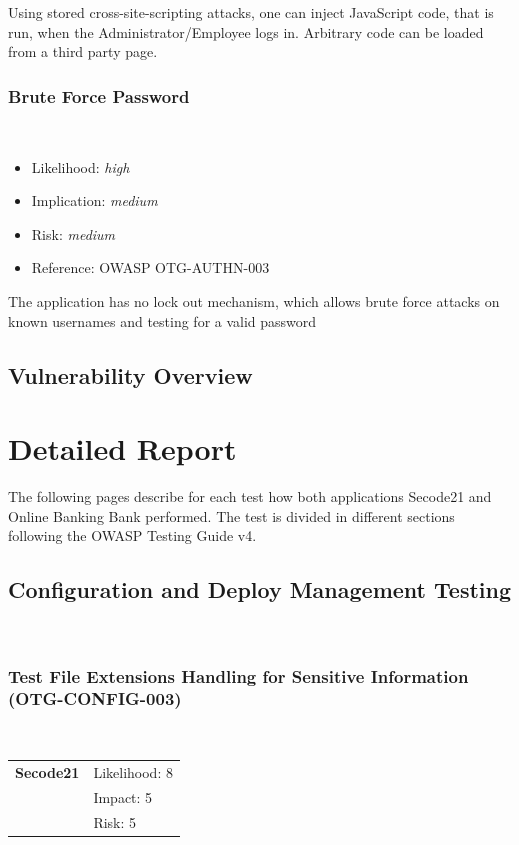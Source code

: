 \documentclass[headsepline,footsepline,footinclude=false,oneside,fontsize=11pt,paper=a4,listof=totoc,bibliography=totoc]{scrbook} %
\begin{document}
Using stored cross-site-scripting attacks, one can inject JavaScript code, that is run, when the Administrator/Employee logs in. Arbitrary code can be loaded from a third party page.

\subsection{{Brute Force Password}}\label{Missing Lock Out Mechanism}\
\begin{itemize}
	\item Likelihood: \textit{high}
	\item Implication: \textit{medium}
	\item Risk: \textit{medium}
	\item Reference: OWASP OTG-AUTHN-003
\end{itemize}
The application has no lock out mechanism, which allows brute force attacks on known usernames and testing
for a valid password


\section{Vulnerability Overview}

\chapter{Detailed Report}

The following pages describe for each test how both applications Secode21 and Online Banking Bank
performed. The test is divided in different sections following the OWASP Testing Guide v4.

\pagebreak


\section{Configuration and Deploy Management Testing}\
\subsection{Test File Extensions Handling for Sensitive Information (OTG-CONFIG-003)}\

\begin{tabular}{cR{12cm}}
	\textbf{Secode21} & Likelihood: 8\\& Impact: 5\\& Risk: 5
\end{tabular}
\end{document}
